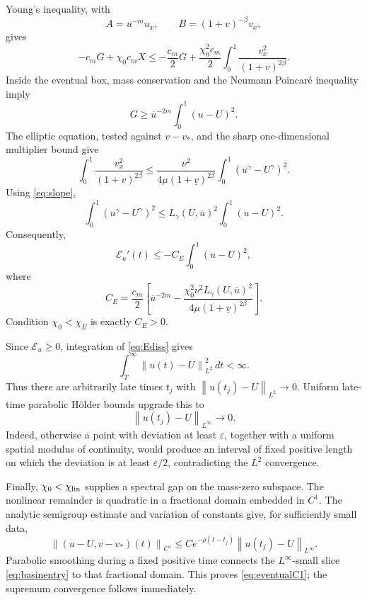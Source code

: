 \documentclass[11pt]{article}
\newcommand{\norm}[1]{\left\lVert #1\right\rVert}
\begin{document}
Young's inequality, with
\[
 A=u^{-m}u_x,\qquad B=(1+v)^{-\beta}v_x,
\]
gives
\begin{equation}
 -c_mG+\chi_0c_mX
 \le-\frac{c_m}{2}G+
 \frac{\chi_0^2c_m}{2}
 \int_0^1\frac{v_x^2}{(1+v)^{2\beta}}.                 \label{eq:halfyoung}
\end{equation}
Inside the eventual box, mass conservation and the Neumann Poincaré
inequality imply
\begin{equation}
 G\ge\overline u^{-2m}
 \int_0^1(u-U)^2.                                      \label{eq:Gcoercive}
\end{equation}
The elliptic equation, tested against \(v-v_*\), and the sharp
one-dimensional multiplier bound give
\begin{equation}
 \int_0^1\frac{v_x^2}{(1+v)^{2\beta}}
 \le
 \frac{\nu^2}
 {4\mu(1+\underline v)^{2\beta}}
 \int_0^1(u^\gamma-U^\gamma)^2.                        \label{eq:ellbound}
\end{equation}
Using \eqref{eq:slope},
\[
 \int_0^1(u^\gamma-U^\gamma)^2
 \le L_\gamma(U,\overline u)^2\int_0^1(u-U)^2.
\]
Consequently,
\begin{equation}
 \mathcal E_u'(t)
 \le-C_E\int_0^1(u-U)^2,                               \label{eq:Ediss}
\end{equation}
where
\begin{equation}
 C_E=\frac{c_m}{2}\left[
 \overline u^{-2m}
 -\frac{\chi_0^2\nu^2L_\gamma(U,\overline u)^2}
 {4\mu(1+\underline v)^{2\beta}}
 \right].                                              \label{eq:CE}
\end{equation}
Condition \(\chi_0<\chi_E\) is exactly \(C_E>0\).

Since \(\mathcal E_u\ge0\), integration of \eqref{eq:Ediss} gives
\[
 \int_T^\infty\norm{u(t)-U}_{L^2}^2\,dt<\infty.
\]
Thus there are arbitrarily late times \(t_j\) with
\(\norm{u(t_j)-U}_{L^2}\to0\).  Uniform late-time parabolic H\"older bounds
upgrade this to
\begin{equation}
 \norm{u(t_j)-U}_{L^\infty}\longrightarrow0.           \label{eq:basinentry}
\end{equation}
Indeed, otherwise a point with deviation at least \(\varepsilon\), together
with a uniform spatial modulus of continuity, would produce an interval of
fixed positive length on which the deviation is at least
\(\varepsilon/2\), contradicting the \(L^2\) convergence.

Finally, \(\chi_0<\chi_{\rm lin}\) supplies a spectral gap on the mass-zero
subspace.  The nonlinear remainder is quadratic in a fractional domain
embedded in \(C^1\).  The analytic semigroup estimate and variation of
constants give, for sufficiently small data,
\[
 \norm{(u-U,v-v_*)(t)}_{C^1}
 \le Ce^{-\rho(t-t_j)}
 \norm{u(t_j)-U}_{L^\infty}.
\]
Parabolic smoothing during a fixed positive time connects the
\(L^\infty\)-small slice \eqref{eq:basinentry} to that fractional domain.
This proves \eqref{eq:eventualC1}; the supremum convergence follows
immediately.
\end{document}
